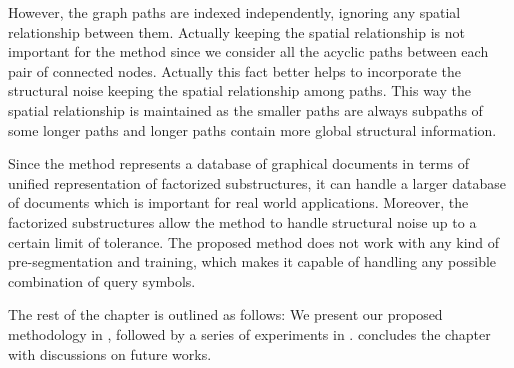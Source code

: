 However, the graph paths are indexed independently, ignoring any spatial relationship between them. Actually keeping the spatial relationship is not important for the method since we consider all the acyclic paths between each pair of connected nodes. Actually this fact better helps to incorporate the structural noise keeping the spatial relationship among paths. This way the spatial relationship is maintained as the smaller paths are always subpaths of some longer paths and longer paths contain more global structural information.

Since the method represents a database of graphical documents in terms of unified representation of factorized substructures, it can handle a larger database of documents which is important for real world applications. Moreover, the factorized substructures allow the method to handle structural noise up to a certain limit of tolerance. The proposed method does not work with any kind of pre-segmentation and training, which makes it capable of handling any possible combination of query symbols.

The rest of the chapter is outlined as follows: We present our proposed methodology in , followed by a series of experiments in .  concludes the chapter with discussions on future works.
